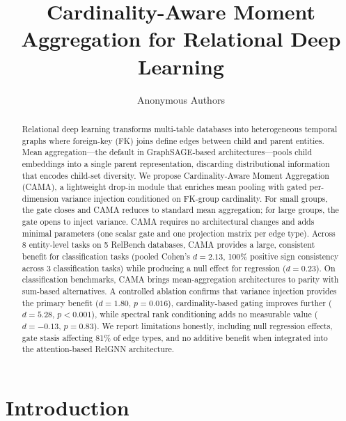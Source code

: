 \documentclass[11pt,letterpaper]{article}
\title{Cardinality-Aware Moment Aggregation for Relational Deep Learning}
\author{Anonymous Authors}
\date{}
\begin{document}
\maketitle

\begin{abstract}
Relational deep learning transforms multi-table databases into heterogeneous temporal graphs where foreign-key (FK) joins define edges between child and parent entities. Mean aggregation---the default in GraphSAGE-based architectures---pools child embeddings into a single parent representation, discarding distributional information that encodes child-set diversity. We propose Cardinality-Aware Moment Aggregation (CAMA), a lightweight drop-in module that enriches mean pooling with gated per-dimension variance injection conditioned on FK-group cardinality. For small groups, the gate closes and CAMA reduces to standard mean aggregation; for large groups, the gate opens to inject variance. CAMA requires no architectural changes and adds minimal parameters (one scalar gate and one projection matrix per edge type). Across 8 entity-level tasks on 5 RelBench databases, CAMA provides a large, consistent benefit for classification tasks (pooled Cohen's $d = 2.13$, 100\% positive sign consistency across 3 classification tasks) while producing a null effect for regression ($d = 0.23$). On classification benchmarks, CAMA brings mean-aggregation architectures to parity with sum-based alternatives. A controlled ablation confirms that variance injection provides the primary benefit ($d = 1.80$, $p = 0.016$), cardinality-based gating improves further ($d = 5.28$, $p < 0.001$), while spectral rank conditioning adds no measurable value ($d = -0.13$, $p = 0.83$). We report limitations honestly, including null regression effects, gate stasis affecting 81\% of edge types, and no additive benefit when integrated into the attention-based RelGNN architecture.
\end{abstract}

\section{Introduction}
\label{sec:intro}
\end{document}
